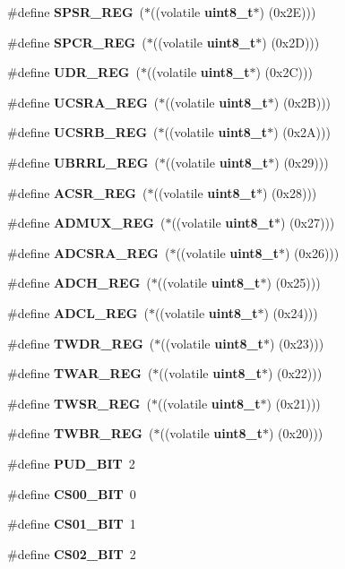 \begin{DoxyCompactItemize}
\item 
\#define \textbf{ S\+P\+S\+R\+\_\+\+R\+EG}~($\ast$((volatile \textbf{ uint8\+\_\+t}$\ast$) (0x2\+E)))
\item 
\#define \textbf{ S\+P\+C\+R\+\_\+\+R\+EG}~($\ast$((volatile \textbf{ uint8\+\_\+t}$\ast$) (0x2\+D)))
\item 
\#define \textbf{ U\+D\+R\+\_\+\+R\+EG}~($\ast$((volatile \textbf{ uint8\+\_\+t}$\ast$) (0x2\+C)))
\item 
\#define \textbf{ U\+C\+S\+R\+A\+\_\+\+R\+EG}~($\ast$((volatile \textbf{ uint8\+\_\+t}$\ast$) (0x2\+B)))
\item 
\#define \textbf{ U\+C\+S\+R\+B\+\_\+\+R\+EG}~($\ast$((volatile \textbf{ uint8\+\_\+t}$\ast$) (0x2\+A)))
\item 
\#define \textbf{ U\+B\+R\+R\+L\+\_\+\+R\+EG}~($\ast$((volatile \textbf{ uint8\+\_\+t}$\ast$) (0x29)))
\item 
\#define \textbf{ A\+C\+S\+R\+\_\+\+R\+EG}~($\ast$((volatile \textbf{ uint8\+\_\+t}$\ast$) (0x28)))
\item 
\#define \textbf{ A\+D\+M\+U\+X\+\_\+\+R\+EG}~($\ast$((volatile \textbf{ uint8\+\_\+t}$\ast$) (0x27)))
\item 
\#define \textbf{ A\+D\+C\+S\+R\+A\+\_\+\+R\+EG}~($\ast$((volatile \textbf{ uint8\+\_\+t}$\ast$) (0x26)))
\item 
\#define \textbf{ A\+D\+C\+H\+\_\+\+R\+EG}~($\ast$((volatile \textbf{ uint8\+\_\+t}$\ast$) (0x25)))
\item 
\#define \textbf{ A\+D\+C\+L\+\_\+\+R\+EG}~($\ast$((volatile \textbf{ uint8\+\_\+t}$\ast$) (0x24)))
\item 
\#define \textbf{ T\+W\+D\+R\+\_\+\+R\+EG}~($\ast$((volatile \textbf{ uint8\+\_\+t}$\ast$) (0x23)))
\item 
\#define \textbf{ T\+W\+A\+R\+\_\+\+R\+EG}~($\ast$((volatile \textbf{ uint8\+\_\+t}$\ast$) (0x22)))
\item 
\#define \textbf{ T\+W\+S\+R\+\_\+\+R\+EG}~($\ast$((volatile \textbf{ uint8\+\_\+t}$\ast$) (0x21)))
\item 
\#define \textbf{ T\+W\+B\+R\+\_\+\+R\+EG}~($\ast$((volatile \textbf{ uint8\+\_\+t}$\ast$) (0x20)))
\item 
\#define \textbf{ P\+U\+D\+\_\+\+B\+IT}~2
\item 
\#define \textbf{ C\+S00\+\_\+\+B\+IT}~0
\item 
\#define \textbf{ C\+S01\+\_\+\+B\+IT}~1
\item 
\#define \textbf{ C\+S02\+\_\+\+B\+IT}~2
\item 

\end{DoxyCompactItemize}
